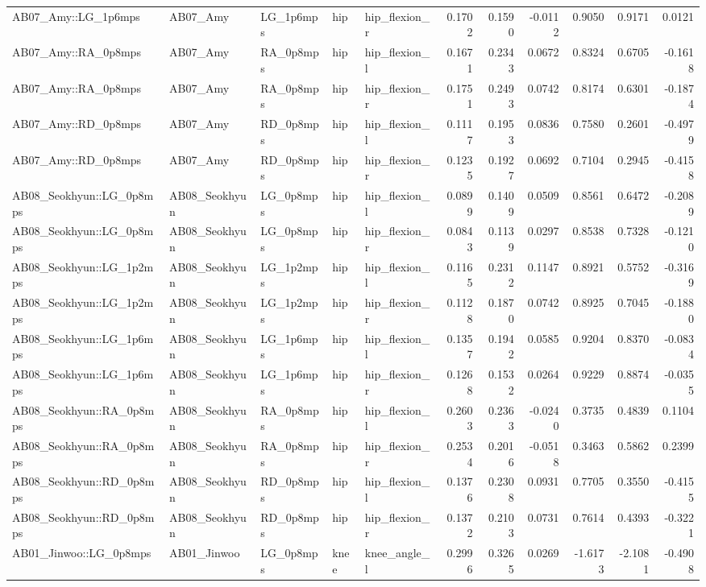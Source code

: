 \begin{table}
\begin{tabular}{lllllrrrrrr}
AB07_Amy::LG_1p6mps & AB07_Amy & LG_1p6mps & hip & hip_flexion_r & 0.1702 & 0.1590 & -0.0112 & 0.9050 & 0.9171 & 0.0121 \\
AB07_Amy::RA_0p8mps & AB07_Amy & RA_0p8mps & hip & hip_flexion_l & 0.1671 & 0.2343 & 0.0672 & 0.8324 & 0.6705 & -0.1618 \\
AB07_Amy::RA_0p8mps & AB07_Amy & RA_0p8mps & hip & hip_flexion_r & 0.1751 & 0.2493 & 0.0742 & 0.8174 & 0.6301 & -0.1874 \\
AB07_Amy::RD_0p8mps & AB07_Amy & RD_0p8mps & hip & hip_flexion_l & 0.1117 & 0.1953 & 0.0836 & 0.7580 & 0.2601 & -0.4979 \\
AB07_Amy::RD_0p8mps & AB07_Amy & RD_0p8mps & hip & hip_flexion_r & 0.1235 & 0.1927 & 0.0692 & 0.7104 & 0.2945 & -0.4158 \\
AB08_Seokhyun::LG_0p8mps & AB08_Seokhyun & LG_0p8mps & hip & hip_flexion_l & 0.0899 & 0.1409 & 0.0509 & 0.8561 & 0.6472 & -0.2089 \\
AB08_Seokhyun::LG_0p8mps & AB08_Seokhyun & LG_0p8mps & hip & hip_flexion_r & 0.0843 & 0.1139 & 0.0297 & 0.8538 & 0.7328 & -0.1210 \\
AB08_Seokhyun::LG_1p2mps & AB08_Seokhyun & LG_1p2mps & hip & hip_flexion_l & 0.1165 & 0.2312 & 0.1147 & 0.8921 & 0.5752 & -0.3169 \\
AB08_Seokhyun::LG_1p2mps & AB08_Seokhyun & LG_1p2mps & hip & hip_flexion_r & 0.1128 & 0.1870 & 0.0742 & 0.8925 & 0.7045 & -0.1880 \\
AB08_Seokhyun::LG_1p6mps & AB08_Seokhyun & LG_1p6mps & hip & hip_flexion_l & 0.1357 & 0.1942 & 0.0585 & 0.9204 & 0.8370 & -0.0834 \\
AB08_Seokhyun::LG_1p6mps & AB08_Seokhyun & LG_1p6mps & hip & hip_flexion_r & 0.1268 & 0.1532 & 0.0264 & 0.9229 & 0.8874 & -0.0355 \\
AB08_Seokhyun::RA_0p8mps & AB08_Seokhyun & RA_0p8mps & hip & hip_flexion_l & 0.2603 & 0.2363 & -0.0240 & 0.3735 & 0.4839 & 0.1104 \\
AB08_Seokhyun::RA_0p8mps & AB08_Seokhyun & RA_0p8mps & hip & hip_flexion_r & 0.2534 & 0.2016 & -0.0518 & 0.3463 & 0.5862 & 0.2399 \\
AB08_Seokhyun::RD_0p8mps & AB08_Seokhyun & RD_0p8mps & hip & hip_flexion_l & 0.1376 & 0.2308 & 0.0931 & 0.7705 & 0.3550 & -0.4155 \\
AB08_Seokhyun::RD_0p8mps & AB08_Seokhyun & RD_0p8mps & hip & hip_flexion_r & 0.1372 & 0.2103 & 0.0731 & 0.7614 & 0.4393 & -0.3221 \\
AB01_Jinwoo::LG_0p8mps & AB01_Jinwoo & LG_0p8mps & knee & knee_angle_l & 0.2996 & 0.3265 & 0.0269 & -1.6173 & -2.1081 & -0.4908 \\

\end{tabular}
\end{table}
